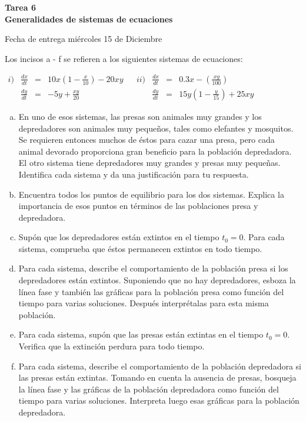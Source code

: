 \documentclass[12pt]{exam}
\begin{document}
\centering


\Large 
\textbf{\huge Tarea 6 \\ \large Generalidades de sistemas de ecuaciones}

\small
Fecha de entrega miércoles 15 de Diciembre
\vskip10pt
\normalsize

\pointformat{\bfseries\boldmath(\thepoints)}
\vskip10pt

    
    \begin{questions}
     \question%
     Los incisos a - f se refieren a los siguientes sistemas de ecuaciones:
     
     $
     \begin{array}{lrclclrcl}
        i)&\frac{dx}{dt}& = & 10x\left(1-\frac{x}{10}\right)-20xy& &ii)& \frac{dx}{dt} & = & 0.3x-\left(\frac{xy}{100}\right)\\
        & \frac{dy}{dt} & = & -5y+\frac{xy}{20} & & &\frac{dy}{dt}& = & 15y\left(1-\frac{y}{15}\right)+25xy
     \end{array}
     $
     \begin{enumerate}[a)]
         \item En uno de esos sistemas, las presas son animales muy grandes y los depredadores son animales muy pequeños, tales como elefantes y mosquitos. Se requieren entonces muchos de éstos para cazar una presa, pero cada animal devorado proporciona gran beneficio para la población depredadora. El otro sistema tiene depredadores muy grandes y presas muy pequeñas. Identifica cada sistema y da una justificación para tu respuesta.
         \item Encuentra todos los puntos de equilibrio para los dos sistemas. Explica la importancia de esos puntos en términos de las poblaciones presa y depredadora.
         \item Supón que los depredadores están extintos en el tiempo $t_0=0$. Para cada sistema, comprueba que éstos permanecen extintos en todo tiempo.
         \item Para cada sistema, describe el comportamiento de la población presa si los depredadores están extintos. Suponiendo que no hay depredadores, esboza la línea fase y también las gráficas para la población presa como función del tiempo para varias soluciones. Después interprétalas para esta misma población.
         \item Para cada sistema, supón que las presas están extintas en el tiempo  $t_0=0$. Verifica que la extinción perdura para todo tiempo.
         \item Para cada sistema, describe el comportamiento de la población depredadora si las presas están extintas. Tomando en cuenta la ausencia de presas, bosqueja la línea fase y las gráficas de la población depredadora como función del tiempo para varias soluciones. Interpreta luego esas gráficas para la población depredadora.
     \end{enumerate}



\end{questions}
\end{document}
